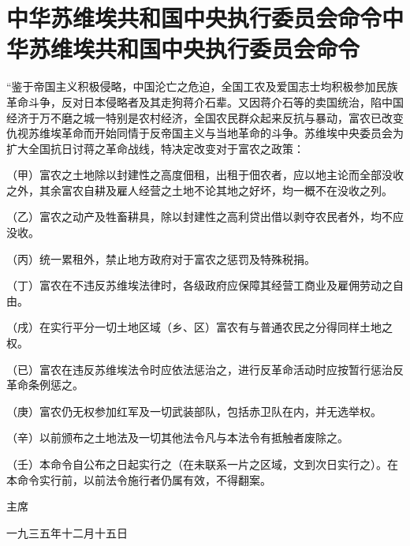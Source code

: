 \section[中华苏维埃共和国中央执行委员会命令中华苏维埃共和国中央执行委员会命令]{中华苏维埃共和国中央执行委员会命令中华苏维埃共和国中央执行委员会命令}


“鉴于帝国主义积极侵略，中国沦亡之危迫，全国工农及爱国志士均积极参加民族革命斗争，反对日本侵略者及其走狗蒋介石辈。又因蒋介石等的卖国统治，陷中国经济于万不磨之城一特别是农村经济，全国农民群众起来反抗与暴动，富农已改变仇视苏维埃革命而开始同情于反帝国主义与当地革命的斗争。苏维埃中央委员会为扩大全国抗日讨蒋之革命战线，特决定改变对于富农之政策：

（甲）富农之土地除以封建性之高度佃租，出租于佃农者，应以地主论而全部没收之外，其余富农自耕及雇人经营之土地不论其地之好坏，均一概不在没收之列。

（乙）富农之动产及牲畜耕具，除以封建性之高利贷出借以剥夺农民者外，均不应没收。

（丙）统一累租外，禁止地方政府对于富农之惩罚及特殊税捐。

（丁）富农在不违反苏维埃法律时，各级政府应保障其经营工商业及雇佣劳动之自由。

（戌）在实行平分一切土地区域（乡、区）富农有与普通农民之分得同样土地之权。

（已）富农在违反苏维埃法令时应依法惩治之，进行反革命活动时应按暂行惩治反革命条例惩之。

（庚）富农仍无权参加红军及一切武装部队，包括赤卫队在内，并无选举权。

（辛）以前颁布之土地法及一切其他法令凡与本法令有抵触者废除之。

（壬）本命令自公布之日起实行之（在未联系一片之区域，文到次日实行之）。在本命令实行前，以前法令施行者仍属有效，不得翻案。

 主席


 一九三五年十二月十五日

